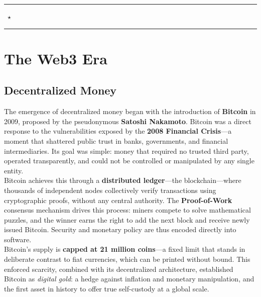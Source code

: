 \documentclass[12pt, a4paper, oneside]{report}
\theoremstyle{definition}
\begin{document}
\vspace{0.6cm}

\begin{center}
  \rule{0.4\linewidth}{0.3pt}~{\large $\star$}~\rule{0.4\linewidth}{0.3pt}
\end{center}




\chapter{The Web3 Era}
\section{Decentralized Money}
\label{chap:decentralized}

The emergence of decentralized money began with the introduction of \textbf{Bitcoin} 
in 2009, proposed by the pseudonymous \textbf{Satoshi Nakamoto}. Bitcoin was a direct 
response to the vulnerabilities exposed by the \textbf{2008 Financial Crisis}—a moment 
that shattered public trust in banks, governments, and financial intermediaries. Its 
goal was simple: money that required no trusted third party, operated transparently, 
and could not be controlled or manipulated by any single entity.\\[0.4cm]

Bitcoin achieves this through a \textbf{distributed ledger}—the blockchain—where 
thousands of independent nodes collectively verify transactions using cryptographic 
proofs, without any central authority. The \textbf{Proof-of-Work} consensus mechanism 
drives this process: miners compete to solve mathematical puzzles, and the winner earns 
the right to add the next block and receive newly issued Bitcoin. Security and monetary 
policy are thus encoded directly into software.\\[0.4cm]

Bitcoin's supply is \textbf{capped at 21 million coins}—a fixed limit that stands in 
deliberate contrast to fiat currencies, which can be printed without bound. This 
enforced scarcity, combined with its decentralized architecture, established Bitcoin 
as \emph{digital gold}: a hedge against inflation and monetary manipulation, and the 
first asset in history to offer true self-custody at a global scale.\\[1.0cm]
\end{document}
